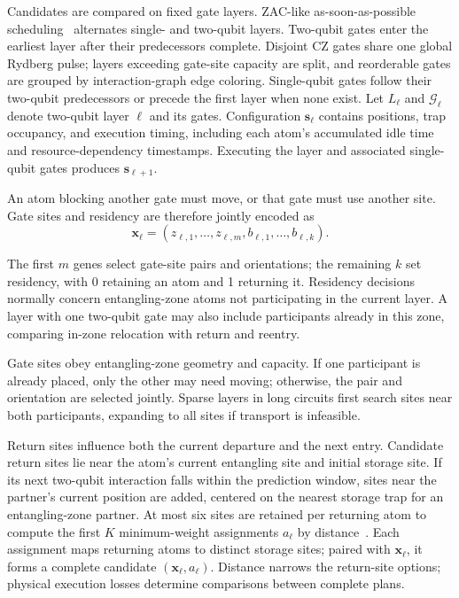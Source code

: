 Candidates are compared on fixed gate layers. ZAC-like as-soon-as-possible scheduling~\cite{lin2025zac} alternates single- and two-qubit layers. Two-qubit gates enter the earliest layer after their predecessors complete. Disjoint CZ gates share one global Rydberg pulse; layers exceeding gate-site capacity are split, and reorderable gates are grouped by interaction-graph edge coloring. Single-qubit gates follow their two-qubit predecessors or precede the first layer when none exist. Let $L_\ell$ and $\mathcal G_\ell$ denote two-qubit layer $\ell$ and its gates. Configuration $\mathbf{s}_\ell$ contains positions, trap occupancy, and execution timing, including each atom's accumulated idle time and resource-dependency timestamps. Executing the layer and associated single-qubit gates produces $\mathbf{s}_{\ell+1}$.

\begin{samepage}
An atom blocking another gate must move, or that gate must use another site. Gate sites and residency are therefore jointly encoded as
\begin{equation}
\mathbf x_\ell=
(z_{\ell,1},\ldots,z_{\ell,m},
 b_{\ell,1},\ldots,b_{\ell,k}).
\label{eq:chromosome}
\end{equation}
\end{samepage}
The first $m$ genes select gate-site pairs and orientations; the remaining $k$ set residency, with 0 retaining an atom and 1 returning it. Residency decisions normally concern entangling-zone atoms not participating in the current layer. A layer with one two-qubit gate may also include participants already in this zone, comparing in-zone relocation with return and reentry.

Gate sites obey entangling-zone geometry and capacity. If one participant is already placed, only the other may need moving; otherwise, the pair and orientation are selected jointly. Sparse layers in long circuits first search sites near both participants, expanding to all sites if transport is infeasible.

Return sites influence both the current departure and the next entry. Candidate return sites lie near the atom's current entangling site and initial storage site. If its next two-qubit interaction falls within the prediction window, sites near the partner's current position are added, centered on the nearest storage trap for an entangling-zone partner. At most six sites are retained per returning atom to compute the first $K$ minimum-weight assignments $a_\ell$ by distance~\cite{murty1968assignment}. Each assignment maps returning atoms to distinct storage sites; paired with $\mathbf x_\ell$, it forms a complete candidate $(\mathbf x_\ell,a_\ell)$. Distance narrows the return-site options; physical execution losses determine comparisons between complete plans.

